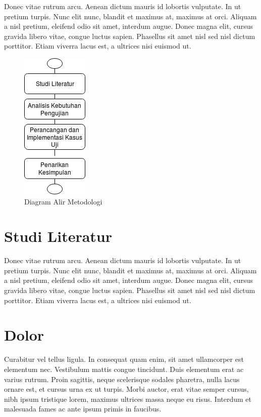 

Donec vitae rutrum arcu. Aenean dictum mauris id lobortis
vulputate. In ut pretium turpis. Nunc elit nunc, blandit et maximus
at, maximus at orci. Aliquam a nisl pretium, eleifend odio sit amet,
interdum augue. Donec magna elit, cursus gravida libero vitae, congue
luctus sapien. Phasellus sit amet nisl sed nisl dictum
porttitor. Etiam viverra lacus est, a ultrices nisi euismod ut.

\begin{figure}[tph]
  \centering
  \includegraphics[width=.2\linewidth]{img/diagram-uji3}
  \caption{Diagram Alir Metodologi}
  \label{fig:diagram-alir}
\end{figure}

\section{Studi Literatur}

Donec vitae rutrum arcu. Aenean dictum mauris id lobortis
vulputate. In ut pretium turpis. Nunc elit nunc, blandit et maximus
at, maximus at orci. Aliquam a nisl pretium, eleifend odio sit amet,
interdum augue. Donec magna elit, cursus gravida libero vitae, congue
luctus sapien. Phasellus sit amet nisl sed nisl dictum
porttitor. Etiam viverra lacus est, a ultrices nisi euismod ut.


\section{Dolor}

Curabitur vel tellus ligula. In consequat quam enim, sit amet
ullamcorper est elementum nec. Vestibulum mattis congue
tincidunt. Duis elementum erat ac varius rutrum. Proin sagittis, neque
scelerisque sodales pharetra, nulla lacus ornare est, et cursus urna
ex ut turpis. Morbi auctor, erat vitae semper cursus, nibh ipsum
tristique lorem, maximus ultrices massa neque eu risus. Interdum et
malesuada fames ac ante ipsum primis in faucibus.


